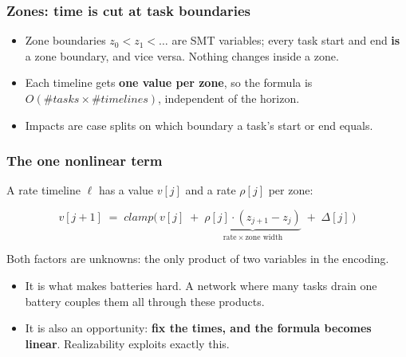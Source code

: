 \begin{frame}
  \frametitle{Zones: time is cut at task boundaries} \small

{\centering
{}\par}

\vspace{0.3cm}
\begin{itemize}
\item Zone boundaries $z_0 < z_1 < \dots$ are SMT variables; every task start and end
      {\bf is} a zone boundary, and vice versa. Nothing changes inside a zone.
\item Each timeline gets {\bf one value per zone}, so the formula is $O(\#\mathit{tasks} \times \#\mathit{timelines})$,
      independent of the horizon.
\item Impacts are case splits on which boundary a task's start or end equals.
\end{itemize}

\end{frame}

\begin{frame}
  \frametitle{The one nonlinear term} \small

A rate timeline $\ell$ has a value $v[j]$ and a rate $\rho[j]$ per zone:

\[
v[j{+}1] \;=\; \mathit{clamp}\big(\,v[j] \;+\; \underbrace{\rho[j] \cdot (z_{j+1} - z_j)}_{\text{rate} \,\times\, \text{zone width}} \;+\; \Delta[j]\,\big)
\]

\vspace{0.2cm}
Both factors are unknowns: the only product of two variables in the encoding.

\pause
\vspace{0.4cm}
\begin{itemize}
\item It is what makes batteries hard. A network where many tasks drain one battery
      couples them all through these products.
\item It is also an opportunity: {\bf fix the times, and the formula becomes linear}.
      Realizability exploits exactly this.
\end{itemize}

\end{frame}

